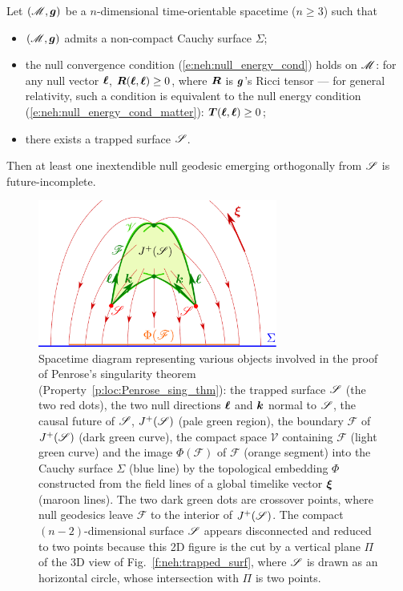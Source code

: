 \begin{prop}
\label{p:loc:Penrose_sing_thm}
Let $(\mathscr{M},\bm{g})$ be a $n$-dimensional time-orientable spacetime ($n\ge 3$) such that
\begin{itemize}
\item $(\mathscr{M},\bm{g})$ admits a non-compact Cauchy surface $\Sigma$;
\item the null convergence condition (\ref{e:neh:null_energy_cond}) holds on $\mathscr{M}$:
for any null vector $\bm{\ell}$, $\bm{R}(\bm{\ell}, \bm{\ell}) \geq 0$, where $\bm{R}$ is
$\bm{g}$'s Ricci tensor --- for general relativity, such a condition is
equivalent to the null energy condition (\ref{e:neh:null_energy_cond_matter}):
$\bm{T}(\bm{\ell}, \bm{\ell}) \geq 0$;
\item there exists a trapped surface $\mathscr{S}$.
\end{itemize}
Then at least one inextendible null geodesic emerging orthogonally from $\mathscr{S}$
is future-incomplete.
\end{prop}

\begin{figure}
\centerline{\includegraphics[width=0.7\textwidth]{loc_penrose_thm.pdf}}
\caption[]{\label{f:loc:penrose_thm} \footnotesize
Spacetime diagram representing various objects involved in the
proof of Penrose's singularity theorem (Property~\ref{p:loc:Penrose_sing_thm}):
the trapped surface $\mathscr{S}$ (the two red dots),
the two null directions $\bm{\ell}$ and $\bm{k}$ normal to $\mathscr{S}$,
the causal future of $\mathscr{S}$, $J^+(\mathscr{S})$ (pale green region),
the boundary $\mathscr{F}$ of $J^+(\mathscr{S})$ (dark green curve),
the compact space $\mathscr{V}$ containing $\mathscr{F}$ (light green curve)
and the image $\Phi(\mathscr{F})$ of $\mathscr{F}$ (orange segment) into
the Cauchy surface $\Sigma$ (blue line) by the topological embedding $\Phi$
constructed from the field lines of a global timelike vector
$\bm{\xi}$ (maroon lines). The two dark green dots are crossover points, where null
geodesics leave $\mathscr{F}$ to the interior of $J^+(\mathscr{S})$.
The compact $(n-2)$-dimensional surface $\mathscr{S}$ appears disconnected and reduced
to two points because this 2D figure is the cut by a vertical plane $\Pi$
of the 3D view of Fig.~\ref{f:neh:trapped_surf}, where $\mathscr{S}$ is drawn as
an horizontal circle, whose intersection with $\Pi$ is two points.
}
\end{figure}



